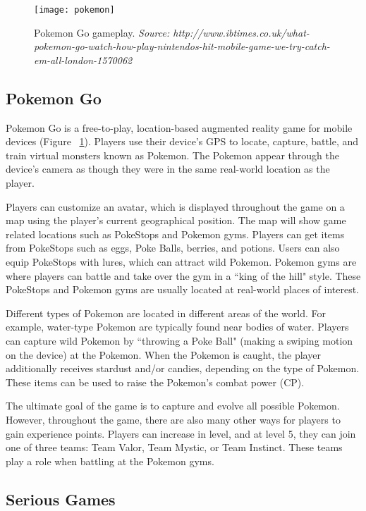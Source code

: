 \begin{figure}[h]
\centering
\texttt{[image: pokemon]}
\caption{Pokemon Go gameplay. \textit{Source: http://www.ibtimes.co.uk/what-pokemon-go-watch-how-play-nintendos-hit-mobile-game-we-try-catch-em-all-london-1570062}}
\label{pokemon}
\end{figure}	

\subsection{Pokemon Go}

Pokemon Go is a free-to-play, location-based augmented reality game for mobile devices  \cite{PokemonGo} (Figure ~\ref{pokemon}). Players use their device's GPS to locate, capture, battle, and train virtual monsters known as Pokemon. The Pokemon appear through the device's camera as though they were in the same real-world location as the player. 

Players can customize an avatar, which is displayed throughout the game on a map using the player's current geographical position. The map will show game related locations such as PokeStops and Pokemon gyms. Players can get items from PokeStops such as eggs, Poke Balls, berries, and potions. Users can also equip PokeStops with lures, which can attract wild Pokemon. Pokemon gyms are where players can battle and take over the gym in a ``king of the hill" style. These PokeStops and Pokemon gyms are usually located at real-world places of interest. 

Different types of Pokemon are located in different areas of the world. For example, water-type Pokemon are typically found near bodies of water. Players can capture wild Pokemon by ``throwing a Poke Ball" (making a swiping motion on the device) at the Pokemon. When the Pokemon is caught, the player additionally receives stardust and/or candies, depending on the type of Pokemon. These items can be used to raise the Pokemon's combat power (CP). 

The ultimate goal of the game is to capture and evolve all possible Pokemon. However, throughout the game, there are also many other ways for players to gain experience points. Players can increase in level, and at level 5, they can join one of three teams: Team Valor, Team Mystic, or Team Instinct. These teams play a role when battling at the Pokemon gyms. 

\subsection{Serious Games}


